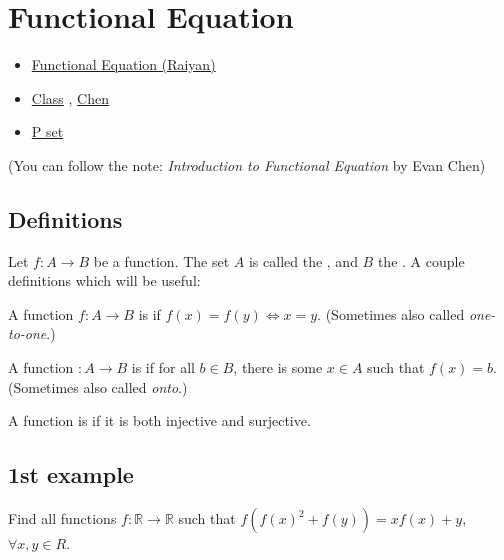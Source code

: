 \chapter{Functional Equation}%

\begin{linkb}
   \begin{itemize}
        \item \href{https://www.youtube.com/watch?v=7QhswMDYy0Y}{Functional Equation (Raiyan)}
        \item \href{https://drive.google.com/file/d/1KknJbbhPo3nK4ZneB3e22_bxlnGXF5j0/view}{Class} , \href{https://drive.google.com/file/d/1Kr_K2i_SQcefIWVR1yvgNN0Pnd3ZG0sg/view}{Chen}
        \item \href{https://drive.google.com/file/d/1cf1tifSEqKebrrDLyk2DONn0-0VlBSWs/view}{P set}
   \end{itemize}
\end{linkb}

(You can follow the note: \textit{Introduction to Functional Equation} by Evan Chen)



\section{Definitions}
Let $f : A \to B$ be a function.
The set $A$ is called the , and $B$ the .
A couple definitions which will be useful:

\begin{definition}
	A function $f : A \to B$ is  if $f(x) = f(y) \iff x=y$.
	(Sometimes also called \emph{one-to-one}.)
\end{definition}
\begin{definition}
	A function $ : A \to B$ is  if for all $b \in B$,
	there is some $x \in A$ such that $f(x) = b$.
	(Sometimes also called \emph{onto}.)
\end{definition}
\begin{definition}
	A function is  if it is both injective and surjective.
\end{definition}

\section{1st example}
\begin{example}
Find all functions $ f:\mathbb{R}\to\mathbb{R} $ such that $ f(f(x)^2+f(y)) = xf(x)+y $,$ \forall x,y\in R $.
\end{example}

